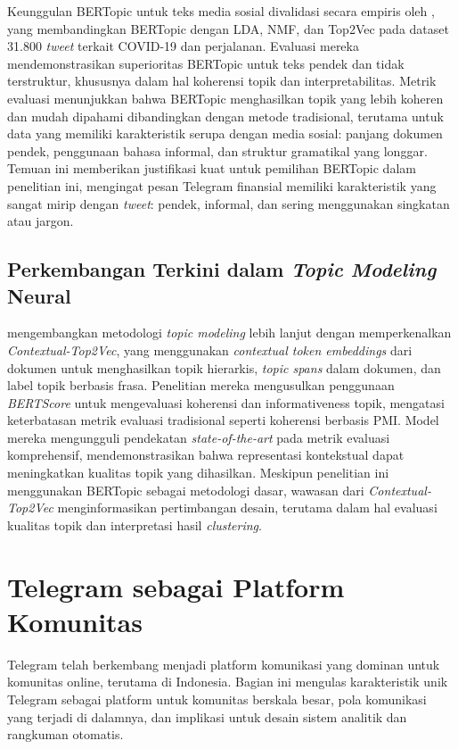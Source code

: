 Keunggulan BERTopic untuk teks media sosial divalidasi secara empiris oleh \textcite{egger2022}, yang membandingkan BERTopic dengan LDA, NMF, dan Top2Vec pada dataset 31.800 \textit{tweet} terkait COVID-19 dan perjalanan. Evaluasi mereka mendemonstrasikan superioritas BERTopic untuk teks pendek dan tidak terstruktur, khususnya dalam hal koherensi topik dan interpretabilitas. Metrik evaluasi menunjukkan bahwa BERTopic menghasilkan topik yang lebih koheren dan mudah dipahami dibandingkan dengan metode tradisional, terutama untuk data yang memiliki karakteristik serupa dengan media sosial: panjang dokumen pendek, penggunaan bahasa informal, dan struktur gramatikal yang longgar. Temuan ini memberikan justifikasi kuat untuk pemilihan BERTopic dalam penelitian ini, mengingat pesan Telegram finansial memiliki karakteristik yang sangat mirip dengan \textit{tweet}: pendek, informal, dan sering menggunakan singkatan atau jargon.

\subsection{Perkembangan Terkini dalam \textit{Topic Modeling} Neural}

\textcite{angelov2024} mengembangkan metodologi \textit{topic modeling} lebih lanjut dengan memperkenalkan \textit{Contextual-Top2Vec}, yang menggunakan \textit{contextual token embeddings} dari dokumen untuk menghasilkan topik hierarkis, \textit{topic spans} dalam dokumen, dan label topik berbasis frasa. Penelitian mereka mengusulkan penggunaan \textit{BERTScore} untuk mengevaluasi koherensi dan informativeness topik, mengatasi keterbatasan metrik evaluasi tradisional seperti koherensi berbasis PMI. Model mereka mengungguli pendekatan \textit{state-of-the-art} pada metrik evaluasi komprehensif, mendemonstrasikan bahwa representasi kontekstual dapat meningkatkan kualitas topik yang dihasilkan. Meskipun penelitian ini menggunakan BERTopic sebagai metodologi dasar, wawasan dari \textit{Contextual-Top2Vec} menginformasikan pertimbangan desain, terutama dalam hal evaluasi kualitas topik dan interpretasi hasil \textit{clustering}.

\section{Telegram sebagai Platform Komunitas}
\label{sec:telegram-platform}

Telegram telah berkembang menjadi platform komunikasi yang dominan untuk komunitas online, terutama di Indonesia. Bagian ini mengulas karakteristik unik Telegram sebagai platform untuk komunitas berskala besar, pola komunikasi yang terjadi di dalamnya, dan implikasi untuk desain sistem analitik dan rangkuman otomatis.

